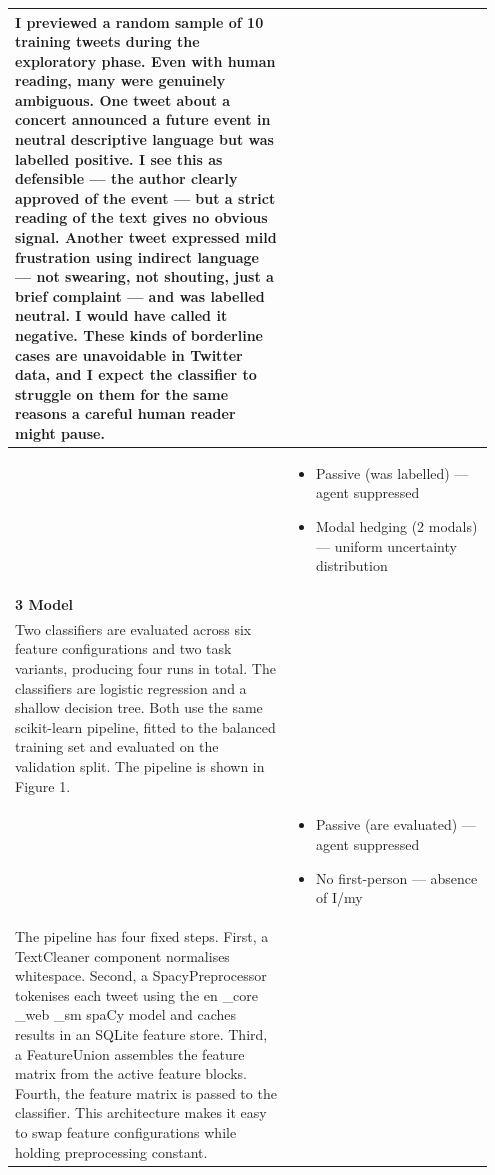 \documentclass[11pt]{article}
\begin{document}
\begin{longtable}{|p{0.55\linewidth}|p{0.40\linewidth}|}
\hline
I previewed a random sample of 10 training tweets during the exploratory phase. Even with human reading, many were genuinely ambiguous. One tweet about a concert announced a future event in neutral descriptive language but was labelled positive. I see this as defensible --- the author clearly approved of the event --- but a strict reading of the text gives no obvious signal. Another tweet expressed mild frustration using indirect language --- not swearing, not shouting, just a brief complaint --- and was labelled neutral. I would have called it negative. These kinds of borderline cases are unavoidable in Twitter data, and I expect the classifier to struggle on them for the same reasons a careful human reader might pause. & \\[2pt]
\hline
\rule[-3.5cm]{0pt}{3.5cm} & \begin{itemize}[leftmargin=1em,itemsep=1pt,topsep=1pt,parsep=0pt]
  \item Passive (was labelled) --- agent suppressed
  \item Modal hedging (2 modals) --- uniform uncertainty distribution
\end{itemize} \\
\hline
\textbf{3 Model}\\[4pt]
Two classifiers are evaluated across six feature configurations and two task variants, producing four runs in total. The classifiers are logistic regression and a shallow decision tree. Both use the same scikit-learn pipeline, fitted to the balanced training set and evaluated on the validation split. The pipeline is shown in Figure 1. & \\[2pt]
\hline
\rule[-3.5cm]{0pt}{3.5cm} & \begin{itemize}[leftmargin=1em,itemsep=1pt,topsep=1pt,parsep=0pt]
  \item Passive (are evaluated) --- agent suppressed
  \item No first-person --- absence of I/my
\end{itemize} \\
\hline
The pipeline has four fixed steps. First, a TextCleaner component normalises whitespace. Second, a SpacyPreprocessor tokenises each tweet using the en \_core \_web \_sm spaCy model and caches results in an SQLite feature store. Third, a FeatureUnion assembles the feature matrix from the active feature blocks. Fourth, the feature matrix is passed to the classifier. This architecture makes it easy to swap feature configurations while holding preprocessing constant. & \\[2pt]

\end{longtable}
\end{document}
